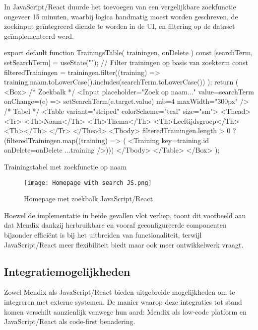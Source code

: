 In JavaScript/React duurde het toevoegen van een vergelijkbare zoekfunctie ongeveer 15 minuten, waarbij logica handmatig moest worden geschreven, de zoekinput geïntegreerd diende te worden in de UI, en filtering op de dataset geïmplementeerd werd.

\begin{listing}[H]
export default function TrainingsTable({ trainingen, onDelete }) {
 const [searchTerm, setSearchTerm] = useState("");
 // Filter trainingen op basis van zoekterm
 const filteredTrainingen = trainingen.filter((training) =>
   training.naam.toLowerCase().includes(searchTerm.toLowerCase())
 );
 return (
  <Box>
  {/* Zoekbalk */}
  <Input
   placeholder="Zoek op naam..."
   value={searchTerm}
   onChange={(e) => setSearchTerm(e.target.value)}
   mb={4}
   maxWidth="300px"
  />
  {/* Tabel */}
  <Table variant="striped" colorScheme="teal" size="sm">
    <Thead>
      <Tr>
        <Th>Naam</Th>
        <Th>Thema</Th>
        <Th>Leeftijdsgroep</Th>
        <Th></Th>
      </Tr>
    </Thead>
    <Tbody>
      {filteredTrainingen.length > 0 ? (filteredTrainingen.map((training) => (
        <Training key={training.id} onDelete={onDelete} {...training} />)))}
    </Tbody>
  </Table>
 </Box>
 );
}   
    \captionsetup{justification=centering}
    \caption{Trainingstabel met zoekfunctie op naam}
    \label{lst:pipeline-clone}
\end{listing}

\begin{figure}[H]
    \centering
    \captionsetup{justification=centering}
    \texttt{[image: Homepage with search JS.png]}
    \caption[\centering Homepage with search bar JavaScript/React]{\label{fig:homepage-with-search-JS} Homepage met zoekbalk JavaScript/React}
\end{figure}


 Hoewel de implementatie in beide gevallen vlot verliep, toont dit voorbeeld aan dat Mendix dankzij herbruikbare en vooraf geconfigureerde componenten bijzonder efficiënt is bij het uitbreiden van functionaliteit, terwijl JavaScript/React meer flexibiliteit biedt maar ook meer ontwikkelwerk vraagt.


\subsection{Integratiemogelijkheden}

Zowel Mendix als JavaScript/React bieden uitgebreide mogelijkheden om te integreren met externe systemen. De manier waarop deze integraties tot stand komen verschilt aanzienlijk vanwege hun aard: Mendix als low-code platform en JavaScript/React als code-first benadering.

